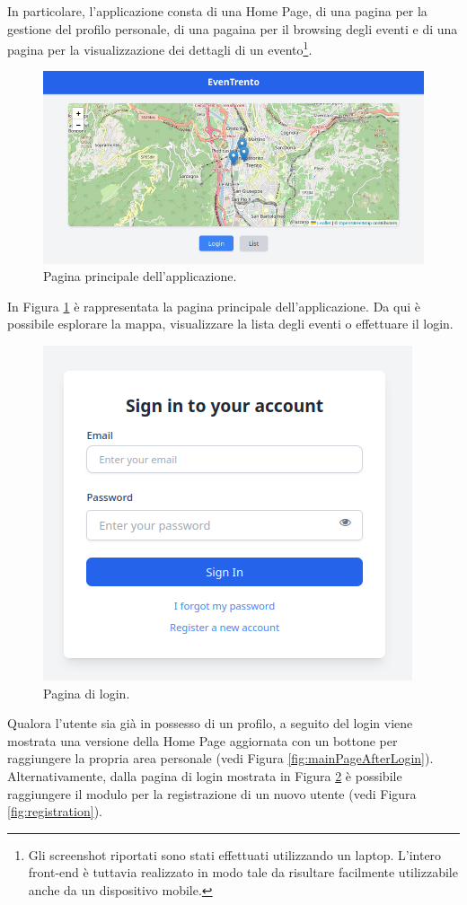 \documentclass[9pt]{extarticle}
\begin{document}
In particolare, l'applicazione consta di una Home Page, di una pagina per la gestione del profilo personale, di una pagaina per il browsing degli eventi e di una pagina per la visualizzazione dei dettagli di un evento\footnote{Gli screenshot riportati sono stati effettuati utilizzando un laptop. L'intero front-end è tuttavia realizzato in modo tale da risultare facilmente utilizzabile anche da un dispositivo mobile.}.

\begin{figure}[!htb]
	\centering
	\includegraphics[width=0.8\linewidth]{./images/Index.png}
	\caption{Pagina principale dell'applicazione.}
	\label{fig:index}
\end{figure}
\newpage

In Figura \ref{fig:index} è rappresentata la pagina principale dell'applicazione. Da qui è possibile esplorare la mappa, visualizzare la lista degli eventi o effettuare il login.

\begin{figure}[!htb]
	\centering
	\includegraphics[width=0.5\linewidth]{./images/Login.png}
	\caption{Pagina di login.}
		\label{fig:login}
\end{figure}

Qualora l'utente sia già in possesso di un profilo, a seguito del login viene mostrata una versione della Home Page aggiornata con un bottone per raggiungere la propria area personale (vedi Figura \ref{fig:mainPageAfterLogin}). Alternativamente, dalla pagina di login mostrata in Figura \ref{fig:login} è possibile raggiungere il modulo per la registrazione di un nuovo utente (vedi Figura \ref{fig:registration}).
\end{document}
